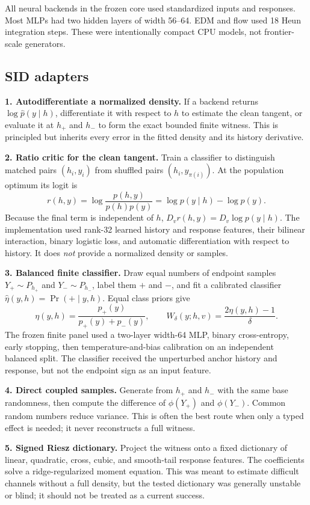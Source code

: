 \documentclass[11pt]{article}
\begin{document}
All neural backends in the frozen core used standardized inputs and responses.  Most
MLPs had two hidden layers of width 56--64.  EDM and flow used 18 Heun integration
steps.  These were intentionally compact CPU models, not frontier-scale generators.

\newpage
\subsection{SID adapters}

\textbf{1. Autodifferentiate a normalized density.}  If a backend returns
$\log\widehat p(y\mid h)$, differentiate it with respect to $h$ to estimate the clean
tangent, or evaluate it at $h_+$ and $h_-$ to form the exact bounded finite witness.
This is principled but inherits every error in the fitted density and its history
derivative.

\textbf{2. Ratio critic for the clean tangent.}  Train a classifier to distinguish
matched pairs $(h_i,y_i)$ from shuffled pairs $(h_i,y_{\pi(i)})$.  At the population
optimum its logit is
\[
  r(h,y)=\log\frac{p(h,y)}{p(h)p(y)}=\log p(y\mid h)-\log p(y).
\]
Because the final term is independent of $h$,
$D_vr(h,y)=D_v\log p(y\mid h)$.  The implementation used rank-32 learned history and
response features, their bilinear interaction, binary logistic loss, and automatic
differentiation with respect to history.  It does \emph{not} provide a normalized
density or samples.

\textbf{3. Balanced finite classifier.}  Draw equal numbers of endpoint samples
$Y_+\sim P_{h_+}$ and $Y_-\sim P_{h_-}$, label them $+$ and $-$, and fit a calibrated
classifier $\widehat\eta(y,h)=\Pr(+\mid y,h)$.  Equal class priors give
\[
  \eta(y,h)=\frac{p_+(y)}{p_+(y)+p_-(y)},\qquad
  W_\delta(y;h,v)=\frac{2\eta(y,h)-1}{\delta}.
\]
The frozen finite panel used a two-layer width-64 MLP, binary cross-entropy, early
stopping, then temperature-and-bias calibration on an independent balanced split.
The classifier received the unperturbed anchor history and response, but not the
endpoint sign as an input feature.

\textbf{4. Direct coupled samples.}  Generate from $h_+$ and $h_-$ with the same base
randomness, then compute the difference of $\phi(Y_+)$ and $\phi(Y_-)$.  Common random
numbers reduce variance.  This is often the best route when only a typed effect is
needed; it never reconstructs a full witness.

\textbf{5. Signed Riesz dictionary.}  Project the witness onto a fixed dictionary of
linear, quadratic, cross, cubic, and smooth-tail response features.  The coefficients
solve a ridge-regularized moment equation.  This was meant to estimate difficult
channels without a full density, but the tested dictionary was generally unstable or
blind; it should not be treated as a current success.
\end{document}
